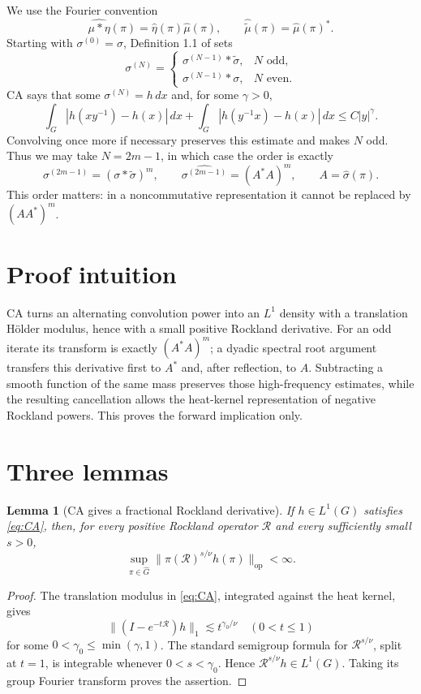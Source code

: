\documentclass[11pt]{article}
\newtheorem{lemma}[theorem]{Lemma}
\newcommand{\Rcal}{\mathcal R}
\newcommand{\wideG}{\widehat G}
\newcommand{\op}{\mathrm{op}}
\begin{document}
We use the Fourier convention
\[
 \widehat{\mu*\eta}(\pi)=\widehat\eta(\pi)\widehat\mu(\pi),
 \qquad \widehat{\widetilde\mu}(\pi)=\widehat\mu(\pi)^*.
\]
Starting with $\sigma^{(0)}=\sigma$, Definition 1.1 of \cite{GHW} sets
\[
 \sigma^{(N)}=
 \begin{cases}
  \sigma^{(N-1)}*\widetilde\sigma,&N\text{ odd},\\
  \sigma^{(N-1)}*\sigma,&N\text{ even}.
 \end{cases}
\]
CA says that some $\sigma^{(N)}=h\,dx$ and, for some $\gamma>0$,
\begin{equation}\label{eq:CA}
 \int_G|h(xy^{-1})-h(x)|\,dx+
 \int_G|h(y^{-1}x)-h(x)|\,dx\le C|y|^\gamma.
\end{equation}
Convolving once more if necessary preserves this estimate and makes $N$ odd.
Thus we may take $N=2m-1$, in which case the order is exactly
\begin{equation}\label{eq:parity}
 \sigma^{(2m-1)}=(\sigma*\widetilde\sigma)^m,
 \qquad
 \widehat{\sigma^{(2m-1)}}=(A^*A)^m,\qquad A=\widehat\sigma(\pi).
\end{equation}
This order matters: in a noncommutative representation it cannot be replaced
by $(AA^*)^m$.

\section{Proof intuition}
CA turns an alternating convolution power into an $L^1$ density with a
translation H\"older modulus, hence with a small positive Rockland
derivative.  For an odd iterate its transform is exactly $(A^*A)^m$; a
dyadic spectral root argument transfers this derivative first to $A^*$ and,
after reflection, to $A$.  Subtracting a smooth function of the same mass
preserves those high-frequency estimates, while the resulting cancellation
allows the heat-kernel representation of negative Rockland powers.  This
proves the forward implication only.

\section{Three lemmas}

\begin{lemma}[CA gives a fractional Rockland derivative]\label{lem:frac}
If $h\in L^1(G)$ satisfies \eqref{eq:CA}, then, for every positive Rockland
operator $\Rcal$ and every sufficiently small $s>0$,
\[
 \sup_{\pi\in\wideG}
 \|\pi(\Rcal)^{s/\nu}\widehat h(\pi)\|_{\op}<\infty.
\]
\end{lemma}
\begin{proof}
The translation modulus in \eqref{eq:CA}, integrated against the heat kernel,
gives
\[
 \|(I-e^{-t\Rcal})h\|_1\lesssim t^{\gamma_0/\nu}
 \quad(0<t\le1)
\]
for some $0<\gamma_0\le\min(\gamma,1)$.  The standard semigroup formula for
$\Rcal^{s/\nu}$, split at $t=1$, is integrable whenever
$0<s<\gamma_0$.  Hence $\Rcal^{s/\nu}h\in L^1(G)$.  Taking its group Fourier
transform proves the assertion.
\end{proof}
\end{document}
